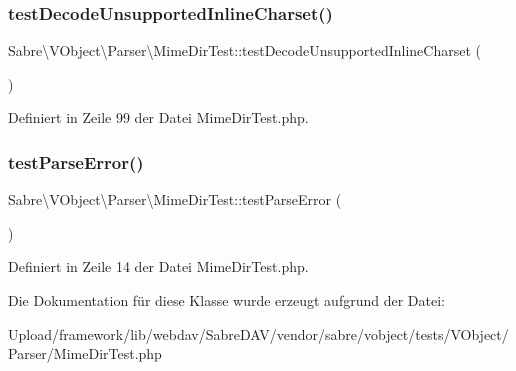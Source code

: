 \subsubsection{\texorpdfstring{test\+Decode\+Unsupported\+Inline\+Charset()}{testDecodeUnsupportedInlineCharset()}}
{\footnotesize\ttfamily Sabre\textbackslash{}\+V\+Object\textbackslash{}\+Parser\textbackslash{}\+Mime\+Dir\+Test\+::test\+Decode\+Unsupported\+Inline\+Charset (\begin{DoxyParamCaption}{ }\end{DoxyParamCaption})}



Definiert in Zeile 99 der Datei Mime\+Dir\+Test.\+php.

\mbox{\label{class_sabre_1_1_v_object_1_1_parser_1_1_mime_dir_test_a97b154216df165122de5849da34fdca7}} 
\subsubsection{\texorpdfstring{test\+Parse\+Error()}{testParseError()}}
{\footnotesize\ttfamily Sabre\textbackslash{}\+V\+Object\textbackslash{}\+Parser\textbackslash{}\+Mime\+Dir\+Test\+::test\+Parse\+Error (\begin{DoxyParamCaption}{ }\end{DoxyParamCaption})}



Definiert in Zeile 14 der Datei Mime\+Dir\+Test.\+php.



Die Dokumentation für diese Klasse wurde erzeugt aufgrund der Datei\+:\begin{DoxyCompactItemize}
\item 
Upload/framework/lib/webdav/\+Sabre\+D\+A\+V/vendor/sabre/vobject/tests/\+V\+Object/\+Parser/Mime\+Dir\+Test.\+php\end{DoxyCompactItemize}
